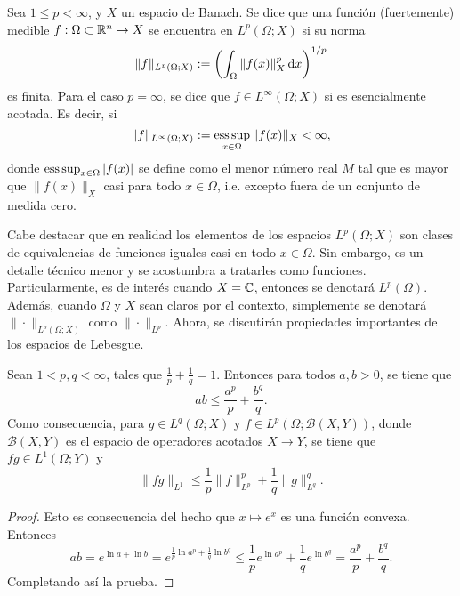 \begin{definition}
    Sea $1\leq p < \infty$, y $X$ un espacio de Banach. Se dice que una función (fuertemente) medible $f:\Omega\subset\mathbb{R}^n\rightarrow X$ se encuentra en $L^p(\Omega;X)$ si su norma 
    \begin{equation*}
        \|f\|_{L^p(\Omega;X)} := \left( \int_\Omega \|f(x)\|_X^p \mathop{}\!\mathrm{d} x
        \right)^{1/p}
    \end{equation*}
    es finita. Para el caso $p=\infty$, se dice que $f\in L^\infty(\Omega;X)$
    si es esencialmente acotada. Es decir, si
    \begin{equation*}
        \|f\|_{L^\infty(\Omega;X)} := \operatorname*{ess\,sup}_{x\in\Omega}\|f(x)\|_X < \infty,
    \end{equation*}
    donde $\operatorname*{ess\,sup}_{x\in\Omega}|f(x)|$ se define como el menor número real $M$
    tal que es mayor que $\|f(x)\|_X$ casi para todo $x\in\Omega$, i.e. excepto fuera de
    un conjunto de medida cero.
\end{definition}
Cabe destacar que en realidad los elementos de los espacios $L^p(\Omega;X)$
son clases de equivalencias de funciones iguales casi en todo $x\in\Omega$.
Sin embargo, es un detalle técnico menor y se acostumbra a tratarles como funciones. Particularmente, es de interés cuando $X=\mathbb{C}$, entonces se denotará $L^p(\Omega)$. Además, cuando $\Omega$ y $X$ sean claros por el contexto, simplemente se denotará
$\|\cdot\|_{L^p(\Omega;X)}$ como $\|\cdot\|_{L^p}$. Ahora, se discutirán propiedades 
importantes de los espacios de Lebesgue.
\begin{proposition}
    Sean $1< p, q< \infty$, tales que $\frac{1}{p} + \frac{1}{q} = 1$.
    Entonces para todos $a, b > 0$, se tiene que 
    \begin{equation*}
        ab \leq \frac{a^p}{p} + \frac{b^q}{q}.
    \end{equation*}
    Como consecuencia, para $g\in L^q(\Omega;X)$ y $f\in L^p(\Omega;\mathcal{B}(X, Y))$, donde $\mathcal{B}(X, Y)$ es el espacio de operadores acotados $X\to Y$, 
    se tiene que $fg \in L^1(\Omega;Y)$ y 
    \begin{equation*}
        \|fg\|_{L^1} \leq \frac{1}{p}\|f\|^p_{L^p} + \frac{1}{q}
        \|g\|_{L^q}^q.
    \end{equation*}
\end{proposition}
\begin{proof}
    Esto es consecuencia del hecho que $x\mapsto e^x$ es una función
    convexa. Entonces
    \begin{equation*}
        ab = e^{\ln a + \ln b} = e^{\frac{1}{p}\ln a^p + 
        \frac{1}{q}\ln b^q} \leq \frac{1}{p}e^{\ln a^p} +
        \frac{1}{q}e^{\ln b^q} = \frac{a^p}{p} + \frac{b^q}{q}.
    \end{equation*}
    Completando así la prueba.
\end{proof}
